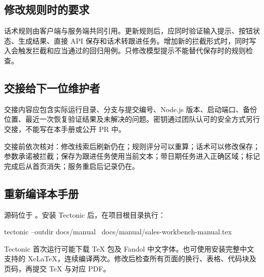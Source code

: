 \documentclass[UTF8,fontset=fandol,zihao=5,a4paper]{ctexart}
\begin{document}
\subsection*{修改规则时的要求}
话术规则由客户端与服务端共同引用。更新规则后，应同时验证输入提示、按钮状态、生成结果、直接 API 保存和话术转跟进任务。增加新的拦截形式时，同时写入会触发拦截和应当通过的回归用例。只修改模型提示不能替代保存时的规则检查。

\subsection*{交接给下一位维护者}
交接内容应包含实际运行目录、分支与提交编号、Node.js 版本、启动端口、备份位置、最近一次恢复验证结果及未解决的问题。密钥通过团队认可的安全方式另行交接，不能写在本手册或公开 PR 中。

交接前依次核对：修改线索后刷新仍在；规则评分可以重算；话术可以修改保存；参数承诺被拦截；保存为跟进任务使用当前文本；带日期任务进入正确区域；标记完成后从首页消失；服务重启后记录仍在。

\subsection*{重新编译本手册}
源码位于 。安装 Tectonic 后，在项目根目录执行：
\begin{shell}
tectonic --outdir docs/manual \
  docs/manual/sales-workbench-manual.tex
\end{shell}
Tectonic 首次运行可能下载 TeX 包及 Fandol 中文字体。也可使用安装完整中文支持的 XeLaTeX，连续编译两次。修改后检查所有页面的换行、表格、代码块及页码，再提交 TeX 与对应 PDF。
\end{document}
